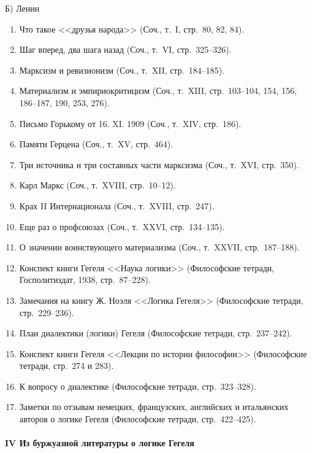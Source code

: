 {{{\centering Б) Ленин \par}

\begin{enumerate}
\item Что такое <<друзья народа>> (Соч., т.~I, стр.~80, 82, 84).
\item Шаг вперед, два шага назад (Соч., т.~VI, стр.~325--326).
\item Марксизм и ревизионизм (Соч., т.~XII, стр.~184--185).
\item Материализм и эмпириокритицизм (Соч., т.~XIII, стр.~103--104, 154, 156,
186--187, 190, 253, 276).
\item Письмо Горькому от 16. XI. 1909 (Соч., т.~XIV, стр.~186).
\item Памяти Герцена (Соч., т.~XV, стр.~464).
\item Три источника и три составных части марксизма (Соч., т.~XVI, стр.~350).
\item Карл Маркс (Соч., т.~XVIII, стр.~10--12).
\item Крах II Интернационала (Соч., т.~XVIII, стр.~247).
\item Еще раз о профсоюзах (Соч., т.~XXVI, стр.~134--135).
\item О значении воинствующего материализма (Соч., т.~XXVII, стр.~187--188).
\item Конспект книги Гегеля <<Наука логики>> (Философские тетради, Госполитиздат,
1938, стр.~87--228).
\item Замечания на книгу Ж. Ноэля <<Логика Гегеля>> (Философские тетради,
стр.~229--236).
\item План диалектики (логики) Гегеля (Философские тетради, стр.~237--242).
\item Конспект книги Гегеля <<Лекции по истории философии>> (Философские тетради,
стр.~274 и 283).
\item К вопросу о диалектике (Философские тетради, стр.~323--328).
\item Заметки по отзывам немецких, французских, английских и итальянских авторов
о логике Гегеля (Философские тетради, стр.~422--425).
\end{enumerate}

\paragraph[IV Из буржуазной литературы о логике Гегеля]
{IV Из буржуазной литературы о логике Гегеля}

}}
